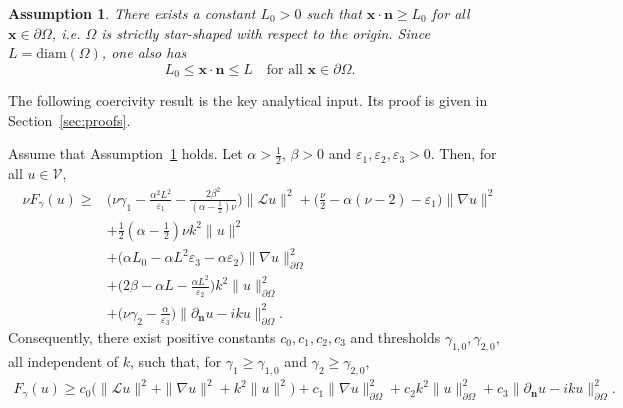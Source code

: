\documentclass[twoside,11pt]{article}
\def\dimx{\nu }
\def\L{{\mathscr{L}}}
\renewcommand{\vec}[1]{\boldsymbol{#1}}
\def\Vc{{\mathscr V}}
\def\L{{\mathscr{L}}}
\newtheorem{assumption}{Assumption}[section]
\begin{document}
{\begin{assumption}\label{ass_omega}
There exists a constant $L_0>0$ such that
$\vec{x}\cdot\vec{n}\ge L_0$ for all $\vec{x}\in\partial\Omega$,
i.e. $\Omega$ is strictly star-shaped with respect to the origin.
Since $L=\mathrm{diam}(\Omega)$, one also has
\[
   L_0 \le \vec{x}\cdot\vec{n} \le L
   \quad \text{for all } \vec{x}\in\partial\Omega .
\]
\end{assumption}

The following coercivity result is the key analytical input. Its proof is
given in Section~\ref{sec:proofs}.

\begin{theorem} %
\label{theorem_coerc_wbc}
Assume that Assumption~\ref{ass_omega} holds. Let
$\alpha>\tfrac12$, $\beta>0$ and
$\varepsilon_1,\varepsilon_2,\varepsilon_3>0$. Then, for all $u\in\Vc$,
\begin{equation}\label{coerc_2}
\begin{split}
\dimx F_\gamma(u)
 \ge & \Big(\dimx \gamma_1
 - \frac{\alpha^2 L^2}{\varepsilon_1}
 - \frac{2\beta^2}{(\alpha-\tfrac12)\dimx}\Big) \|\L u\|^2
 + \Big(\frac{\dimx}{2}-\alpha(\dimx-2)-\varepsilon_1\Big)\|\nabla u\|^2 \\
& + \frac12(\alpha-\tfrac12)\dimx k^2\|u\|^2 \\
& + \Big(\alpha L_0-\alpha L^2\varepsilon_3-\alpha\varepsilon_2\Big)
   \|\nabla u\|^2_{\partial\Omega} \\
& + \Big(2\beta-\alpha L-\frac{\alpha L^2}{\varepsilon_2}\Big)
   k^2\|u\|^2_{\partial\Omega} \\
& + \Big(\dimx\gamma_2-\frac{\alpha}{\varepsilon_3}\Big)
   \|\partial_{\mathbf n}u-iku\|^2_{\partial\Omega}.
\end{split}
\end{equation}
Consequently, there exist positive constants
$c_0,c_1,c_2,c_3$ and thresholds $\gamma_{1,0},\gamma_{2,0}$,
all independent of $k$, such that, for
$\gamma_1\ge\gamma_{1,0}$ and $\gamma_2\ge\gamma_{2,0}$,
\begin{equation}
\label{coerc_d}
\begin{split}
F_\gamma(u) \ge
c_0\big(\|\L u\|^2+\|\nabla u\|^2+k^2\|u\|^2\big)
+ c_1\|\nabla u\|^2_{\partial\Omega}
+ c_2 k^2\|u\|^2_{\partial\Omega}
+ c_3\|\partial_{\mathbf n}u-iku\|^2_{\partial\Omega}.
\end{split}
\end{equation}
\end{theorem}

}
\end{document}
